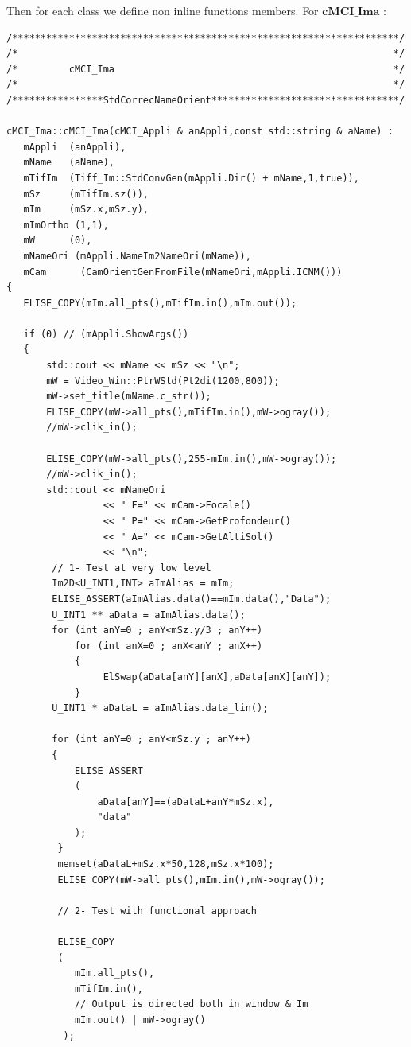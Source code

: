 Then for each class we define non inline functions members. For $\textbf{cMCI\_Ima}$ :
\begin{verbatim}
/********************************************************************/
/*                                                                  */
/*         cMCI_Ima                                                 */
/*                                                                  */
/****************StdCorrecNameOrient*********************************/

cMCI_Ima::cMCI_Ima(cMCI_Appli & anAppli,const std::string & aName) :
   mAppli  (anAppli),
   mName   (aName),
   mTifIm  (Tiff_Im::StdConvGen(mAppli.Dir() + mName,1,true)),
   mSz     (mTifIm.sz()),
   mIm     (mSz.x,mSz.y),
   mImOrtho (1,1),
   mW      (0),
   mNameOri (mAppli.NameIm2NameOri(mName)),
   mCam      (CamOrientGenFromFile(mNameOri,mAppli.ICNM()))
{
   ELISE_COPY(mIm.all_pts(),mTifIm.in(),mIm.out());

   if (0) // (mAppli.ShowArgs())
   {
       std::cout << mName << mSz << "\n";
       mW = Video_Win::PtrWStd(Pt2di(1200,800));
       mW->set_title(mName.c_str());
       ELISE_COPY(mW->all_pts(),mTifIm.in(),mW->ogray());
       //mW->clik_in();

       ELISE_COPY(mW->all_pts(),255-mIm.in(),mW->ogray());
       //mW->clik_in();
       std::cout << mNameOri
                 << " F=" << mCam->Focale()
                 << " P=" << mCam->GetProfondeur()
                 << " A=" << mCam->GetAltiSol()
                 << "\n";
        // 1- Test at very low level
        Im2D<U_INT1,INT> aImAlias = mIm;
        ELISE_ASSERT(aImAlias.data()==mIm.data(),"Data");
        U_INT1 ** aData = aImAlias.data();
        for (int anY=0 ; anY<mSz.y/3 ; anY++)
            for (int anX=0 ; anX<anY ; anX++)
            {
                 ElSwap(aData[anY][anX],aData[anX][anY]);
            }
        U_INT1 * aDataL = aImAlias.data_lin();

        for (int anY=0 ; anY<mSz.y ; anY++)
        {
            ELISE_ASSERT
            (
                aData[anY]==(aDataL+anY*mSz.x),
                "data"
            );
         }
         memset(aDataL+mSz.x*50,128,mSz.x*100);
         ELISE_COPY(mW->all_pts(),mIm.in(),mW->ogray());

         // 2- Test with functional approach

         ELISE_COPY
         (
            mIm.all_pts(),
            mTifIm.in(),
            // Output is directed both in window & Im
            mIm.out() | mW->ogray()
          );


\end{verbatim}

